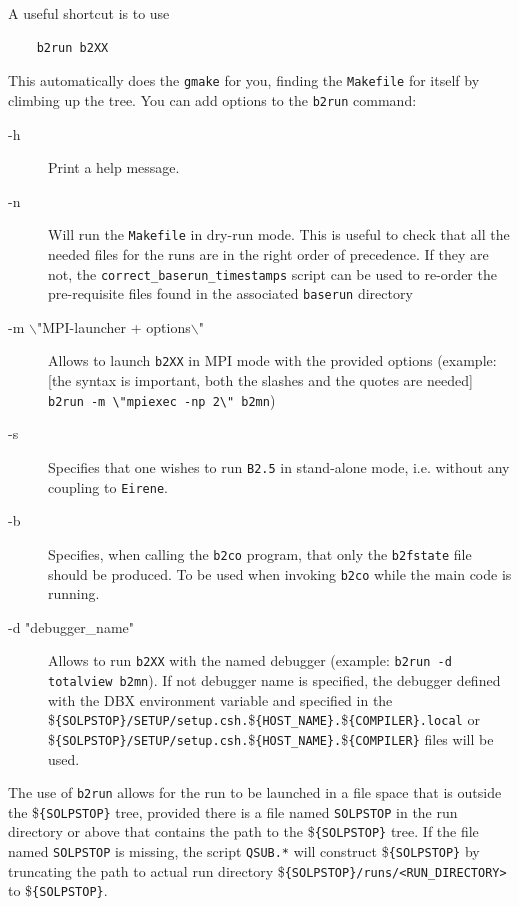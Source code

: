 \documentclass[a4paper,10pt]{report}
\begin{document}
A useful shortcut is to use\label{b2run}
\begin{verbatim}
    b2run b2XX
\end{verbatim}
This automatically does the {\tt gmake} for you, finding the {\tt Makefile}
for itself by climbing up the tree. You can add options to the {\tt b2run} command:
\begin{description}
  \item[-h] Print a help message.
  \item[-n] Will run the {\tt Makefile} in dry-run mode. This is useful to check that all the needed files for the runs are in the right order of precedence. If they are not, the {\tt correct\_baserun\_timestamps} script can be used to re-order the pre-requisite files found in the associated {\tt baserun} directory
  \item[-m $\backslash$"MPI-launcher + options$\backslash$"] Allows to launch {\tt b2XX} in MPI
    mode with the provided options (example: [the syntax is important, both
      the slashes and the quotes are needed] \verb!b2run -m \"mpiexec -np 2\" b2mn!)
  \item[-s] Specifies that one wishes to run {\tt B2.5} in stand-alone mode, i.e. without any coupling to {\tt Eirene}.
  \item[-b] Specifies, when calling the {\tt b2co} program, that only the {\tt b2fstate} file should be produced. To be used when invoking {\tt b2co} while the main code is running.
  \item[-d "debugger\_name"] Allows to run {\tt b2XX} with the named debugger (example: {\tt b2run -d totalview b2mn}). If not debugger name is specified, the debugger defined with the DBX environment variable and specified in the \${\tt \{SOLPSTOP\}/SETUP/setup.csh.}\${\tt \{HOST\_NAME\}.}\${\tt \{COMPILER\}.local} or \${\tt \{SOLPSTOP\}/SETUP\allowbreak/setup.csh.}\${\tt \{HOST\_NAME\}.}\${\tt \{COMPILER\}} files will be used.
\end{description}

The use of {\tt b2run} allows for the run to be launched
in a file space that is outside the \${\tt \{SOLPSTOP\}} tree, provided there is a file named
{\tt SOLPSTOP} in the run directory or above that contains the path to the \${\tt \{SOLPSTOP\}} tree.
If the file named {\tt SOLPSTOP} is missing, the script {\tt QSUB.*} will construct \${\tt \{SOLPSTOP\}} by
truncating the path to actual run directory \${\tt \{SOLPSTOP\}/runs/<RUN\_DIRECTORY>} to \${\tt \{SOLPSTOP\}}.
\end{document}
